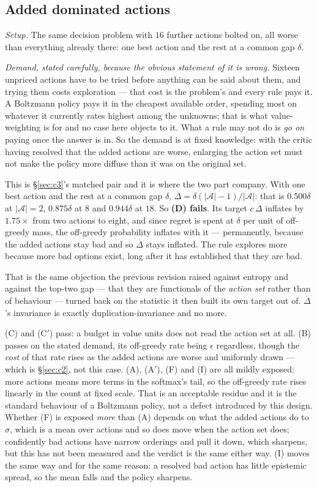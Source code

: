 \documentclass{article}
\newcommand{\actions}{\mathcal{A}}
\newcommand{\gapbar}{\overline{\Delta}}
\newcommand{\srank}{\sigma}
\begin{document}
\subsection{Added dominated actions}
\label{sec:c4}

\emph{Setup.} The same decision problem with $16$ further actions bolted on, all worse than
everything already there: one best action and the rest at a common gap $\delta$.

\emph{Demand, stated carefully, because the obvious statement of it is wrong.} Sixteen unpriced
actions have to be tried before anything can be said about them, and trying them costs
exploration --- that cost is the problem's and every rule pays it. A Boltzmann policy pays it in
the cheapest available order, spending most on whatever it currently rates highest among the
unknowns; that is what value-weighting is for and no case here objects to it. What a rule may not
do is \emph{go on} paying once the answer is in. So the demand is at fixed knowledge: with the
critic having resolved that the added actions are worse, enlarging the action set must not make
the policy more diffuse than it was on the original set.

This is \S\ref{sec:c3}'s matched pair and it is where the two part company. With one best action
and the rest at a common gap $\delta$, $\gapbar = \delta(|\actions|-1)/|\actions|$: that is
$0.500\delta$ at $|\actions| = 2$, $0.875\delta$ at $8$ and $0.944\delta$ at $18$. So
\textbf{(D) fails}. Its target $c\,\gapbar$ inflates by $1.75\times$ from two actions to eight,
and since regret is spent at $\delta$ per unit of off-greedy mass, the off-greedy probability
inflates with it --- permanently, because the added actions stay bad and so $\gapbar$ stays
inflated. The rule explores more because more bad options exist, long after it has established
that they are bad.

That is the same objection the previous revision raised against entropy and against the top-two
gap --- that they are functionals of the \emph{action set} rather than of behaviour --- turned
back on the statistic it then built its own target out of. $\gapbar$'s invariance is exactly
duplication-invariance and no more.

(C) and (C$'$) pass: a budget in value units does not read the action set at all. (B) passes on
the stated demand, its off-greedy rate being $\epsilon$ regardless, though the \emph{cost} of that
rate rises as the added actions are worse and uniformly drawn --- which is \S\ref{sec:c2}, not
this case. (A), (A$'$), (F) and (I) are all mildly exposed: more actions means more terms in the
softmax's tail, so the off-greedy rate rises linearly in the count at fixed scale. That is an
acceptable residue and it is the standard behaviour of a Boltzmann policy, not a defect
introduced by this design. Whether (F) is exposed \emph{more} than (A) depends on what the added
actions do to $\srank$, which is a mean over actions and so does move when the action set does;
confidently bad actions have narrow orderings and pull it down, which sharpens, but this has not
been measured and the verdict is the same either way. (I) moves the same way and for the same
reason: a resolved bad action has little epistemic spread, so the mean falls and the policy
sharpens.
\end{document}
